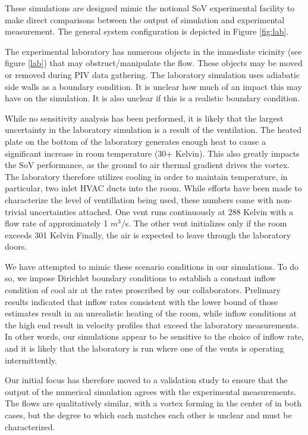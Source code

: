 
These simulations are designed mimic the notional SoV experimental
facility to make direct comparisons between the output of simulation and
experimental measurement. The general system configuration is depicted
in Figure \ref{fig:lab}. 

The experimental laboratory has numerous objects
in the immediate vicinity (see figure \ref{lab}) that may
obstruct/manipulate the flow. These objects may be moved or removed
during PIV data gathering. The laboratory simulation uses adiabatic side
walls as a boundary condition. It is unclear how much of an impact this
may have on the simulation. It is also unclear if this is a realistic
boundary condition. 

While no sensitivity analysis has been performed, it is likely that the
largest uncertainty in the laboratory simulation is a result of the
ventilation. The heated plate on the bottom of the laboratory
generates enough heat to cause a significant increase in room
temperature (30+ Kelvin). This also greatly impacts the SoV
performance, as the ground to air thermal gradient drives the
vortex. The laboratory therefore utilizes cooling in order to maintain
temperature, in particular, two inlet HVAC ducts into the room. While
efforts have been made to characterize the level of ventillation being
used, these numbers come with non-trivial uncertainties attached. One
vent runs continuously at 288 Kelvin with a flow rate of approximately 1 
$m^3$/s.
The other vent initializes only if the room exceeds 301 Kelvin
Finally, the air is expected to leave through the laboratory doors.

We have attempted to mimic these scenario conditions in our
simulations. To do so, we impose Dirichlet boundary conditions to
establish a constant inflow condition of cool air at the rates 
proscribed by our collaborators. Prelimary results indicated that 
inflow rates consistent with the lower bound of those estimates result in an
unrealistic heating of the room, while inflow conditions at the high end
result in velocity profiles that exceed the laboratory measurements. In
other words, our simulations appear to be sensitive to the choice of
inflow rate, and it is likely that the laboratory is run where one of
the vents is operating intermittently. 

%
%
%

Our initial focus has therefore moved to a validation study to ensure that the
output of the numerical simulation agrees with the experimental
measurements. The flows are qualitatively similar, with a vortex forming
in the center of in both cases, but the degree to which each matches
each other is unclear and must be characterized. 

